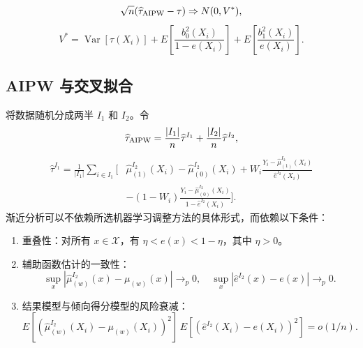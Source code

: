\[
\sqrt n(\widehat\tau_{\rm AIPW}-\tau)\Rightarrow N(0,V^*),
\]
\[
V^*=\operatorname{Var}[\tau(X_i)]
+E\left[\frac{b_0^2(X_i)}{1-e(X_i)}\right]
+E\left[\frac{b_1^2(X_i)}{e(X_i)}\right].
\]
\subsection{AIPW 与交叉拟合}
将数据随机分成两半 $I_1$ 和 $I_2$。令
\[
\widehat\tau_{\rm AIPW}=\frac{|I_1|}{n}\widehat\tau^{I_1}
+\frac{|I_2|}{n}\widehat\tau^{I_2},
\]
\begin{align*}
\widehat\tau^{I_1}=\frac1{|I_1|}\sum_{i\in I_1}\bigg[&\widehat\mu_{(1)}^{I_2}(X_i)-\widehat\mu_{(0)}^{I_2}(X_i)
+W_i\frac{Y_i-\widehat\mu_{(1)}^{I_2}(X_i)}{\widehat e^{I_2}(X_i)}\\
&-(1-W_i)\frac{Y_i-\widehat\mu_{(0)}^{I_2}(X_i)}{1-\widehat e^{I_2}(X_i)}\bigg].
\end{align*}
渐近分析可以不依赖所选机器学习调整方法的具体形式，而依赖以下条件：
\begin{enumerate}
\item 重叠性：对所有 $x\in\mathcal X$，有 $\eta<e(x)<1-\eta$，其中 $\eta>0$。
\item 辅助函数估计的一致性：
\[
\sup_x|\widehat\mu_{(w)}^{I_2}(x)-\mu_{(w)}(x)|\longrightarrow_p0,
\quad \sup_x|\widehat e^{I_2}(x)-e(x)|\longrightarrow_p0.
\]
\item 结果模型与倾向得分模型的风险衰减：
\[
E[(\widehat\mu_{(w)}^{I_2}(X_i)-\mu_{(w)}(X_i))^2]\,
E[(\widehat e^{I_2}(X_i)-e(X_i))^2]=o(1/n).
\]
\end{enumerate}
